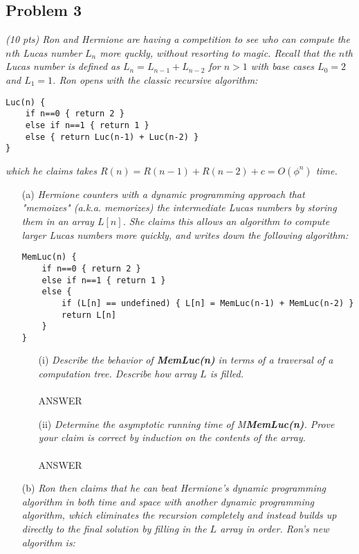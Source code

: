 \documentclass[12pt]{article}
\begin{document}
{\begin{enumerate}
\section*{{\selectfont Problem 3}}
\textit{(10 pts) Ron and Hermione are having a competition to see who can compute the $n$th Lucas number $L_n$ more quckly, without resorting to magic. Recall that the $n$th Lucas number is defined as $L_n=L_{n-1}+L_{n-2}$ for $n>1$ with base cases $L_0=2$ and $L_1=1$. Ron opens with the classic recursive algorithm:}
\begin{small}
\begin{verbatim}
Luc(n) {
    if n==0 { return 2 }
    else if n==1 { return 1 }
    else { return Luc(n-1) + Luc(n-2) }
}
\end{verbatim}
\end{small}
\textit{which he claims takes $R(n)=R(n-1)+R(n-2)+c=O(\phi^n)$ time.}
\begin{enumerate}
\item[(a)] \textit{Hermione counters with a dynamic programming approach that "memoizes" (a.k.a. memorizes) the intermediate Lucas numbers by storing them in an array $L[n]$. She claims this allows an algorithm to compute larger Lucas numbers more quickly, and writes down the following algorithm:}
\begin{small}
\begin{verbatim}
MemLuc(n) {
    if n==0 { return 2 }
    else if n==1 { return 1 }
    else { 
        if (L[n] == undefined) { L[n] = MemLuc(n-1) + MemLuc(n-2) }
        return L[n]
    }
}
\end{verbatim}
\end{small}
\begin{enumerate}
\item[(i)] \textit{Describe the behavior of \textbf{MemLuc(n)} in terms of a traversal of a computation tree. Describe how array $L$ is filled.}
\\\\
ANSWER
\\
\item[(ii)] \textit{Determine the asymptotic running time of M\textbf{MemLuc(n)}. Prove your claim is correct by induction on the contents of the array.}
\\\\
ANSWER
\\
\end{enumerate}
\item[(b)] \textit{Ron then claims that he can beat Hermione's dynamic programming algorithm in both time and space with another dynamic programming algorithm, which eliminates the recursion completely and instead builds up directly to the final solution by filling in the $L$ array in order. Ron's new algorithm is:}

\end{enumerate}
\end{enumerate}}
\end{document}
